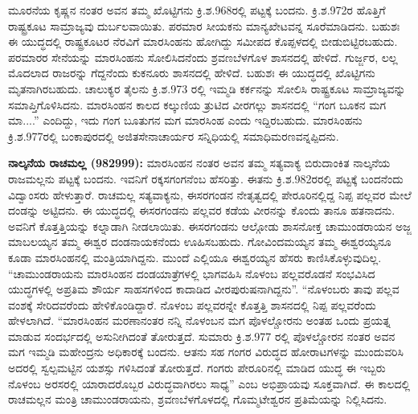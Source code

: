 ಮೂರನೆಯ ಕೃಷ್ಣನ ನಂತರ ಅವನ ತಮ್ಮ ಖೊಟ್ಟಿಗನು ಕ್ರಿ.ಶ.968ರಲ್ಲಿ ಪಟ್ಟಕ್ಕೆ ಬಂದನು. ಕ್ರಿ.ಶ.972ರ ಹೊತ್ತಿಗೆ ರಾಷ್ಟ್ರಕೂಟ ಸಾಮ್ರಾಜ್ಯವು ದುರ್ಬಲವಾಯಿತು. ಪರಮಾರ ಸೀಯಕನು ಮಾನ್ಯಖೇಟವನ್ನ ಸೂರೆಮಾಡಿದನು. ಬಹುಶಃ ಈ ಯುದ್ಧದಲ್ಲಿ ರಾಷ್ಟ್ರಕೂಟರ ನೆರವಿಗೆ ಮಾರಸಿಂಹನು ಹೋಗಿದ್ದು ಸಮೀಪದ ಕೊಪ್ಪಳದಲ್ಲಿ ಬೀಡುಬಿಟ್ಟಿರಬಹುದು. ಪರಮಾರರ ಸೇನೆಯನ್ನು ಮಾರಸಿಂಹನು ಸೋಲಿಸಿದನೆಂದು ಶ್ರವಣಬೆಳಗೊಳ ಶಾಸನದಲ್ಲಿ ಹೇಳಿದೆ. ಗುರ್ಜ್ಜರ, ಲಲ್ಲ ಮೊದಲಾದ ರಾಜರನ್ನು ಗೆದ್ದನೆಂದು ಕುಕನೂರು ಶಾಸನದಲ್ಲಿ ಹೇಳಿದೆ. ಬಹುಶಃ ಈ ಯುದ್ಧದಲ್ಲಿ ಖೊಟ್ಟಿಗನು ಮೃತನಾಗಿರಬಹುದು. ಚಾಲುಕ್ಯರ ತೈಲನು ಕ್ರಿ.ಶ.973 ರಲ್ಲಿ ಇಮ್ಮಡಿ ಕರ್ಕನನ್ನು ಸೋಲಿಸಿ ರಾಷ್ಟ್ರಕೂಟ ಸಾಮ್ರಾಜ್ಯವನ್ನು ಸಮಾಪ್ತಿಗೊಳಿಸಿದನು. ಮಾರಸಿಂಹನ ಕಾಲದ ಕಲ್ಕುಣಿಯ ತ್ರುಟಿದ ವೀರಗಲ್ಲು ಶಾಸನದಲ್ಲಿ “ಗಂಗ ಬೂಕನ ಮಗ ಮಾ....” ಎಂದಿದ್ದು, ಇದು ಗಂಗ ಬೂತುಗನ ಮಗ ಮಾರಸಿಂಹ ಎಂದು ಇದ್ದಿರಬಹುದು. ಮಾರಸಿಂಹನು ಕ್ರಿ.ಶ.977ರಲ್ಲಿ ಬಂಕಾಪುರದಲ್ಲಿ ಅಜಿತಸೇನಾಚಾರ್ಯರ ಸನ್ನಿಧಿಯಲ್ಲಿ ಸಮಾಧಿಮರಣವನ್ನಪ್ಪಿದನು.

\textbf{ ನಾಲ್ಕನೆಯ ರಾಚಮಲ್ಲ (982\general{\enginline{-}}999):} ಮಾರಸಿಂಹನ ನಂತರ ಅವನ ತಮ್ಮ ಸತ್ಯವಾಕ್ಯ ಬಿರುದಾಂಕಿತ ನಾಲ್ಕನೆಯ ರಾಜಮಲ್ಲನು ಪಟ್ಟಕ್ಕೆ ಬಂದನು. ಇವನಿಗೆ ರಕ್ಕಸಗಂಗನೆಂಬ ಹೆಸರಿತ್ತು. ಈತನು ಕ್ರಿ.ಶ.982ರರಲ್ಲಿ ಪಟ್ಟಕ್ಕೆ ಬಂದನೆಂದು ವಿದ್ವಾಂಸರು ಹೇಳುತ್ತಾರೆ. ರಾಚಮಲ್ಲ ಸತ್ಯವಾಕ್ಯನು, ಈಸರಗಂಡನ ನೇತೃತ್ವದಲ್ಲಿ ಪೇರೂರಿನಲ್ಲಿದ್ದ ನಿಪ್ಪ ಪಲ್ಲವರ ಮೇಲೆ ದಂಡನ್ನು ಅಟ್ಟಿದನು. ಈ ಯುದ್ಧದಲ್ಲಿ ಈಸರಗಂಡನು ಪಲ್ಲವರ ಕಡೆಯ ವೀರನನ್ನು ಕೊಂದು ತಾನೂ ಹತನಾದನು. ಅವನಿಗೆ ಕೊತ್ತತ್ತಿಯನ್ನು ಕಲ್ನಾಡಾಗಿ ನೀಡಲಾಯಿತು. ಈಸರಗಂಡನು ಆಲ್ಗೋಡು ಶಾಸನೋಕ್ತ ಚಾಮುಂಡರಾಯನ ಅಜ್ಜ ಮಾಬಲಯ್ಯನ ತಮ್ಮ ಈಶ್ವರ ದಂಡನಾಯಕನೆಂದು ಊಹಿಸಬಹುದು. ಗೋವಿಂದಮಯ್ಯನ ತಮ್ಮ ಈಶ್ವರಯ್ಯನೂ ಕೂಡಾ ಮಾರಸಿಂಹನಲ್ಲಿ ಮಂತ್ರಿಯಾಗಿದ್ದನು. ಮುಂದೆ ಎಲ್ಲಿಯೂ ಈಶ್ವರಯ್ಯನ ಹೆಸರು ಕಾಣಿಸಿಕೊಳ್ಳುವುದಿಲ್ಲ. “ಚಾಮುಂಡರಾಯನು ಮಾರಸಿಂಹನ ದಂಡಯಾತ್ರೆಗಳಲ್ಲಿ ಭಾಗವಹಿಸಿ ನೊಳಂಬ ಪಲ್ಲವರೊಡನೆ ಸಂಭವಿಸಿದ ಯುದ್ಧಗಳಲ್ಲಿ ಅಪ್ರತಿಮ ಶೌರ್ಯ ಸಾಹಸಗಳಿಂದ ಕಾದಾಡಿದ ವೀರಪುರುಷನಾಗಿದ್ದನು”. “ನೊಳಂಬರು ತಾವು ಪಲ್ಲವ ವಂಶಕ್ಕೆ ಸೇರಿದವರೆಂದು ಹೇಳಿಕೊಂಡಿದ್ದಾರೆ. ನೊಳಂಬ ಪಲ್ಲವರನ್ನೇ ಕೊತ್ತತ್ತಿ ಶಾಸನದಲ್ಲಿ ನಿಪ್ಪ ಪಲ್ಲವರೆಂದು ಹೇಳಲಾಗಿದೆ. “ಮಾರಸಿಂಹನ ಮರಣಾನಂತರ ನನ್ನಿ ನೊಳಂಬನ ಮಗ ಪೊಳಲ್ಚೋರನು ಅಂತಹ ಒಂದು ಪ್ರಯತ್ನ ಮಾಡುವ ಸಂದರ್ಭದಲ್ಲಿ ಅಸುನೀಗಿದಂತೆ ತೋರುತ್ತದೆ. ಸುಮಾರು ಕ್ರಿ.ಶ.977 ರಲ್ಲಿ ಪೊಳಲ್ಚೋರನ ನಂತರ ಅವನ ಮಗ ಇಮ್ಮಡಿ ಮಹೇಂದ್ರನು ಅಧಿಕಾರಕ್ಕೆ ಬಂದನು. ಆತನು ಸಹ ಗಂಗರ ವಿರುದ್ಧದ ಹೋರಾಟಗಳನ್ನು ಮುಂದುವರಿಸಿ ಅದರಲ್ಲಿ ಸ್ವಲ್ಪಮಟ್ಟಿನ ಯಶಸ್ಸು ಗಳಿಸಿದಂತೆ ತೋರುತ್ತದೆ. ಗಂಗರು ಪೇರೂರಿನಲ್ಲಿ ಮಾಡಿದ ಯುದ್ಧ ಈ ಇಬ್ಬರು ನೊಳಂಬ ಅರಸರಲ್ಲಿ ಯಾರಾದರೊಬ್ಬರ ವಿರುದ್ಧವಾಗಿರಲು ಸಾಧ್ಯ” ಎಂಬ ಅಭಿಪ್ರಾಯವು ಸೂಕ್ತವಾಗಿದೆ. ಈ ಕಾಲದಲ್ಲಿ ರಾಚಮಲ್ಲನ ಮಂತ್ರಿ ಚಾಮುಂಡರಾಯನು, ಶ್ರವಣಬೆಳಗೊಳದಲ್ಲಿ ಗೊಮ್ಮಟೇಶ್ವರನ ಪ್ರತಿಮೆಯನ್ನು ನಿಲ್ಲಿಸಿದನು.

